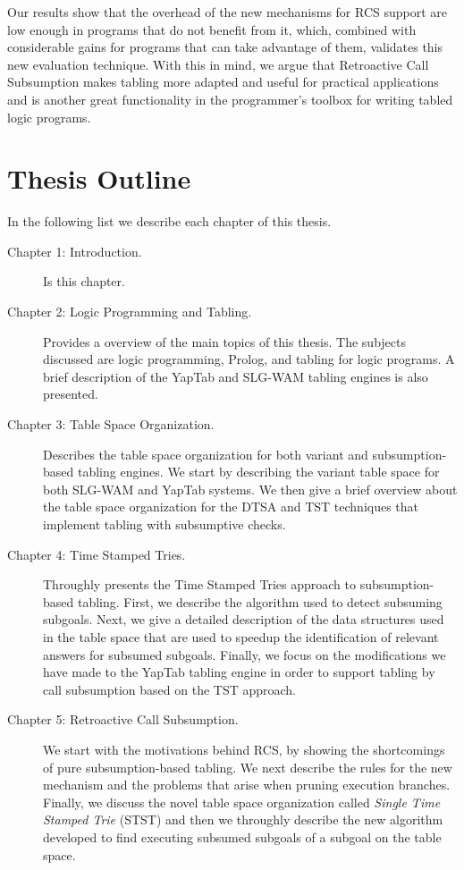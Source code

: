 Our results show that the overhead of the new mechanisms for RCS support are low enough in programs that do not
benefit from it, which, combined with considerable gains for programs that can take advantage of them, validates
this new evaluation technique. With this in mind, we argue that Retroactive Call Subsumption makes tabling
more adapted and useful for practical applications and is another great functionality in the programmer's toolbox for
writing tabled logic programs.

\section{Thesis Outline}

In the following list we describe each chapter of this thesis.

\begin{description}

   \item[Chapter 1: Introduction.] Is this chapter.
   
   \item[Chapter 2: Logic Programming and Tabling.] Provides a overview of the main topics of this thesis.
   The subjects discussed are logic programming, Prolog, and tabling for logic programs. A brief description
   of the YapTab and SLG-WAM tabling engines is also presented.
   
   \item[Chapter 3: Table Space Organization.] Describes the table space organization for both variant and
   subsumption-based tabling engines. We start by describing the variant table space for both SLG-WAM and
   YapTab systems. We then give a brief overview about the table space organization for the DTSA and TST
   techniques that implement tabling with subsumptive checks.
   
   \item[Chapter 4: Time Stamped Tries.] Throughly presents the Time Stamped Tries approach to subsumption-based
   tabling. First, we describe the algorithm used to detect subsuming subgoals. Next,
   we give a detailed description of the data structures used in the table space that are used to speedup
   the identification of relevant answers for subsumed subgoals. Finally, we focus on the modifications we have
   made to the YapTab tabling engine in order to support tabling by call subsumption based on the TST approach.
   
   \item[Chapter 5: Retroactive Call Subsumption.] We start with the motivations behind RCS, by showing the shortcomings
   of pure subsumption-based tabling. We next describe the rules for the new mechanism and the problems that arise
   when pruning execution branches. Finally, we discuss the novel table space organization called \emph{Single Time
   Stamped Trie} (STST) and then we throughly describe the new algorithm developed to find executing subsumed subgoals
   of a subgoal on the table space.
   

\end{description}
